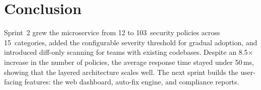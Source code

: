 

\section{Conclusion}

Sprint~2 grew the microservice from 12 to 103~security policies across 15~categories, added the configurable severity threshold for gradual adoption, and introduced diff-only scanning for teams with existing codebases. Despite an 8.5$\times$ increase in the number of policies, the average response time stayed under 50\,ms, showing that the layered architecture scales well. The next sprint builds the user-facing features: the web dashboard, auto-fix engine, and compliance reports.
